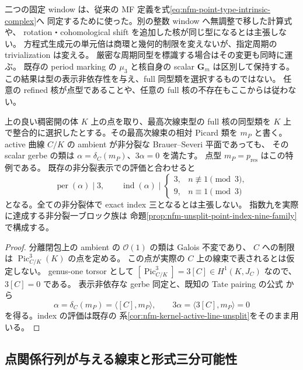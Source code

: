 \begin{remark}
二つの固定 window は、従来の MF 定義を式\eqref{eq:nfm-point-type-intrinsic-complex}へ
同定するために使った。別の整数 window へ無調整で移した計算式や、
rotation・cohomological shift を追加した核が同じ型になるとは主張しない。
方程式生成元の単元倍は商環と幾何的制限を変えないが、指定周期の trivialization は変える。
厳密な周期同型を標識する場合はその変更も同時に運ぶ。
既存の period marking の $\mu_3$ と核自身の scalar $\mathbf G_m$ は区別して保持する。
この結果は型の表示非依存性を与え、full 同型類を選択するものではない。
任意の refined 核が点型であることや、任意の full 核の不存在もここからは従わない。
\end{remark}

\begin{corollary}
\label{cor:nfm-unsplit-point-scalar-period-three}
上の良い稠密開の体 $K$ 上の点を取り、最高次線束型の full 核の同型類を
$K$ 上で整合的に選択したとする。その最高次線束の相対 Picard 類を $m_P$ と書く。
active 曲線 $C/K$ の ambient が非分裂な Brauer--Severi 平面であっても、
その scalar gerbe の類は $\alpha=\delta_C(m_P)$、$3\alpha=0$ を満たす。
点型 $m_P=p_{\mathrm{res}}$ はこの特例である。
既存の非分裂表示での評価と合わせると
\[
 \operatorname{per}(\alpha)\mid3,\qquad
 \operatorname{ind}(\alpha)\mid
 \begin{cases}
 3,&n\not\equiv1\pmod3,\\
 9,&n\equiv1\pmod3
 \end{cases}
\]
となる。全ての非分裂体で exact index 三となるとは主張しない。
指数九を実際に達成する非分裂一ブロック族は
命題\ref{prop:nfm-unsplit-point-index-nine-family}で構成する。
\end{corollary}

\begin{proof}
分離閉包上の ambient の $\mathcal O(1)$ の類は Galois 不変であり、
$C$ への制限は $\operatorname{Pic}^3_{C/K}(K)$ の点を定める。
この点が実際の $C$ 上の線束で表されるとは仮定しない。
genus-one torsor として
$[\operatorname{Pic}^3_{C/K}]=3[C]\in H^1(K,J_C)$ なので、$3[C]=0$ である。
表示非依存な gerbe 同定と、既知の Tate pairing の公式
\cite[Theorem~3.1]{NFMCiperianiKrashen}から
\[
 \alpha=\delta_C(m_P)
        =\langle[C],m_P\rangle,
 \qquad
 3\alpha=\langle3[C],m_P\rangle=0
\]
を得る。index の評価は既存の
系\ref{cor:nfm-kernel-active-line-unsplit}をそのまま用いる。
\end{proof}

\subsection{点関係行列が与える線束と形式三分可能性}


